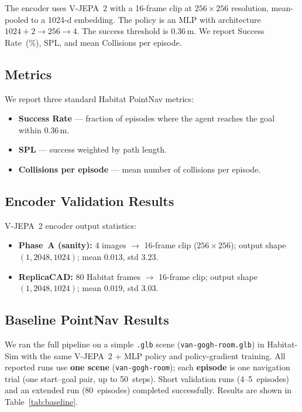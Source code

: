 \documentclass{article}
\begin{document}
\noindent
The encoder uses V-JEPA~2 with a 16-frame clip at $256\times256$ resolution,
mean-pooled to a 1024-d embedding. The policy is an MLP with architecture
$1024{+}2 \to 256 \to 4$. The success threshold is $0.36\,$m. We report
Success Rate~(\%), SPL, and mean Collisions per episode.

\subsection{Metrics}

We report three standard Habitat PointNav metrics:
\begin{itemize}
  \item \textbf{Success Rate} --- fraction of episodes where the agent reaches the goal
        within $0.36\,$m.
  \item \textbf{SPL} --- success weighted by path length.
  \item \textbf{Collisions per episode} --- mean number of collisions per episode.
\end{itemize}

\subsection{Encoder Validation Results}

V-JEPA~2 encoder output statistics:
\begin{itemize}
  \item \textbf{Phase~A (sanity):} 4 images $\to$ 16-frame clip ($256\times256$);
        output shape $(1, 2048, 1024)$; mean $0.013$, std $3.23$.
  \item \textbf{ReplicaCAD:} 80 Habitat frames $\to$ 16-frame clip; output shape
        $(1, 2048, 1024)$; mean $0.019$, std $3.03$.
\end{itemize}

\subsection{Baseline PointNav Results}

We ran the full pipeline on a simple \texttt{.glb} scene (\texttt{van-gogh-room.glb})
in Habitat-Sim with the same V-JEPA~2 + MLP policy and policy-gradient training. All
reported runs use \textbf{one scene} (\texttt{van-gogh-room}); each \textbf{episode} is
one navigation trial (one start--goal pair, up to 50~steps). Short validation runs
(4--5~episodes) and an extended run (80~episodes) completed successfully. Results are
shown in Table~\ref{tab:baseline}.
\end{document}
